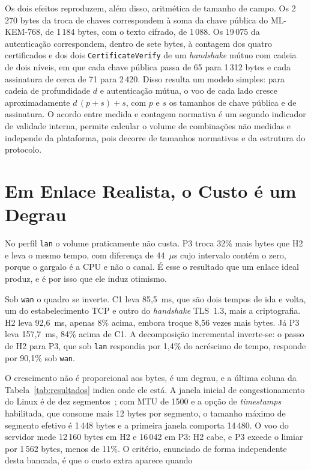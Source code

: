 \documentclass[conference]{IEEEtran}
\begin{document}
Os dois efeitos reproduzem, além disso, aritmética de tamanho de campo. Os
2\,270 bytes da troca de chaves correspondem à soma da chave pública do
ML-KEM-768, de 1\,184 bytes, com o texto cifrado, de 1\,088. Os 19\,075 da
autenticação correspondem, dentro de sete bytes, à contagem dos quatro
certificados e dos dois \texttt{CertificateVerify} de um \textit{handshake} mútuo
com cadeia de dois níveis, em que cada chave pública passa de 65 para 1\,312
bytes e cada assinatura de cerca de 71 para 2\,420. Disso resulta um modelo
simples: para cadeia de profundidade $d$ e autenticação mútua, o voo de cada lado
cresce aproximadamente $d\,(p + s) + s$, com $p$ e $s$ os tamanhos de chave
pública e de assinatura. O acordo entre medida e contagem normativa é um segundo
indicador de validade interna, permite calcular o volume de combinações não
medidas e independe da plataforma, pois decorre de tamanhos normativos e da
estrutura do protocolo.

\section{Em Enlace Realista, o Custo é um Degrau}
\label{sec:degrau}

No perfil \texttt{lan} o volume praticamente não custa. P3 troca 32\% mais bytes
que H2 e leva o mesmo tempo, com diferença de 44~$\mu$s cujo intervalo contém o
zero, porque o gargalo é a CPU e não o canal. É esse o resultado que um enlace
ideal produz, e é por isso que ele induz otimismo.

Sob \texttt{wan} o quadro se inverte. C1 leva 85,5~ms, que são dois tempos de ida
e volta, um do estabelecimento TCP e outro do \textit{handshake} TLS~1.3, mais a
criptografia. H2 leva 92,6~ms, apenas 8\% acima, embora troque 8,56 vezes mais
bytes. Já P3 leva 157,7~ms, 84\% acima de C1. A decomposição incremental
inverte-se: o passo de H2 para P3, que sob \texttt{lan} respondia por 1,4\% do
acréscimo de tempo, responde por 90,1\% sob \texttt{wan}.

O crescimento não é proporcional aos bytes, é um degrau, e a última coluna da
Tabela~\ref{tab:resultados} indica onde ele está. A janela inicial de
congestionamento do Linux é de dez segmentos~\cite{rfc6928}; com MTU de 1500 e a
opção de \textit{timestamps} habilitada, que consome mais 12 bytes por segmento,
o tamanho máximo de segmento efetivo é 1\,448 bytes e a primeira janela comporta
14\,480. O voo do servidor mede 12\,160 bytes em H2 e 16\,042 em P3: H2 cabe, e
P3 excede o limiar por 1\,562 bytes, menos de 11\%. O critério, enunciado de
forma independente desta bancada, é que o custo extra aparece quando
\end{document}
